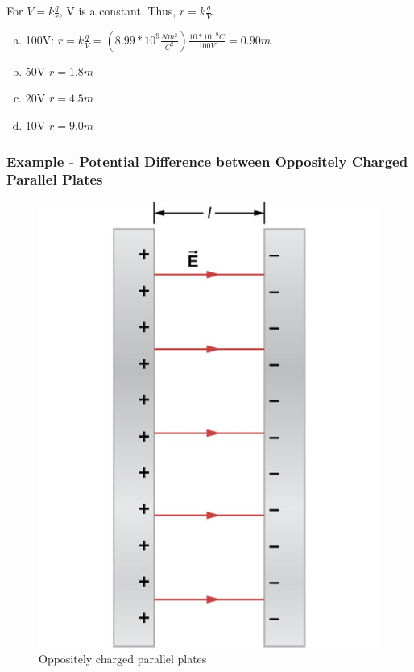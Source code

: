 \documentclass[14pt]{memoir}
\begin{document}
For $V = k\frac{q}{r}$, V is a constant. Thus, $r = k\frac{q}{V}$.

\begin{enumerate}[(a)]
\item 100V: $r = k\frac{q}{V} = (8.99 * 10^9 \frac{Nm^2}{C^2}) \frac{10 * 10^{-9} C}{100V} = 0.90m$
\item 50V $r = 1.8m$
\item 20V $r = 4.5m$
\item 10V $r = 9.0m$
\end{enumerate}

\subsubsection{Example - Potential Difference between Oppositely Charged Parallel Plates}

\begin{figure}[H]
\begin{center}
\includegraphics[scale=0.50]{fig/fig_07_37.jpg}
\caption{Oppositely charged parallel plates}
\label{fig:07_37}
\end{center}
\end{figure}
\end{document}

